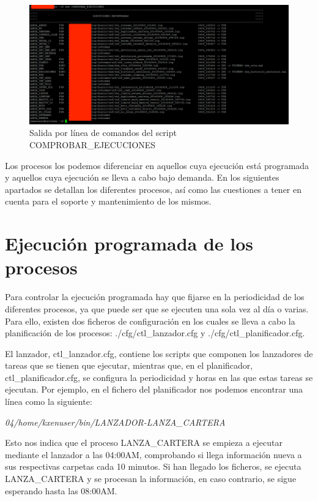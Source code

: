 \documentclass[a4paper, 12pt]{book}
\begin{document}
\begin{figure}
  \centering
  \includegraphics[width=15cm, keepaspectratio]{img/comprobar_ejecuciones}
  \caption{Salida por línea de comandos del script COMPROBAR\_EJECUCIONES}
  \label{fig:comprobar_ejecuciones}
\end{figure}

Los procesos los podemos diferenciar en aquellos cuya ejecución está programada y aquellos cuya ejecución se lleva a cabo bajo demanda. En los siguientes apartados se detallan los diferentes procesos, así como las cuestiones a tener en cuenta para el soporte y mantenimiento de los mismos.

\section{Ejecución programada de los procesos} 
\label{sec:ejecucion_programada}
Para controlar la ejecución programada hay que fijarse en la periodicidad de los diferentes procesos, ya que puede ser que se ejecuten una sola vez al día o varias. Para ello, existen dos ficheros de configuración en los cuales se lleva a cabo la planificación de los procesos: ./cfg/ctl\_lanzador.cfg y ./cfg/ctl\_planificador.cfg.

El lanzador, ctl\_lanzador.cfg, contiene los scripts que componen los lanzadores de tareas que se tienen que ejecutar, mientras que, en el planificador, ctl\_planificador.cfg, se configura la periodicidad y horas en las que estas tareas se ejecutan. Por ejemplo, en el fichero del planificador nos podemos encontrar una línea como la siguiente:
\begin{center}
	\textit{04\textbar/home/kxenuser/bin/LANZADOR-LANZA\_CARTERA}
\end{center}

Esto nos indica que el proceso LANZA\_CARTERA se empieza a ejecutar mediante el lanzador a las 04:00AM, comprobando si llega información nueva a sus respectivas carpetas cada 10 minutos. Si han llegado los ficheros, se ejecuta LANZA\_CARTERA y se procesan la información, en caso contrario, se sigue esperando hasta las 08:00AM.
\end{document}
